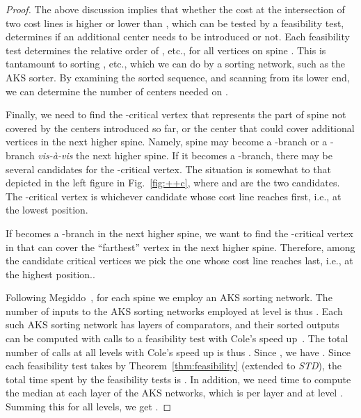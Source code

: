 \documentclass{llncs}
\newcommand{\QED}{\hfill}
\begin{document}
{\begin{proof}
The above discussion implies that whether the cost at the intersection of two cost lines
is higher or lower than ,
which can be tested by a feasibility test, 
determines if an additional center needs to be introduced or not.
Each feasibility test determines the relative order of , etc.,
for all vertices on spine .
This is tantamount to sorting , etc.,
which we can do by a sorting network, such as the AKS sorter.
By examining the sorted sequence, 
and scanning  from its lower end,
we can determine the number of centers needed on .
 

Finally, we need to find the -critical vertex that represents the part of spine 
not covered by the centers introduced so far,
or the center that could cover additional vertices in the next higher spine.
Namely,
spine  may become a -branch or a -branch {\em vis-\`{a}-vis}
the next higher spine.
If it becomes a -branch,
there may be several candidates for the -critical vertex.
The situation is somewhat to that depicted in the left figure in Fig.~\ref{fig:++c},
where  and  are the two candidates.
The -critical vertex is whichever candidate whose cost line reaches  first,
i.e., at the lowest position.

If  becomes a -branch in the next higher spine,
we want to find the -critical vertex in  that can cover the ``farthest'' vertex
in the next higher spine.
Therefore, among the candidate critical vertices we pick the one whose cost line reaches  last,
i.e., at the highest position..

Following Megiddo~\cite{megiddo1983c},
for each spine we employ an AKS sorting network.
The number of inputs to the AKS sorting networks employed at level  is thus .
Each such AKS sorting network has  layers of comparators,
and their sorted outputs can be computed with  calls to a feasibility test
with Cole's speed up~\cite{cole1987}.
The total number of calls at all levels  with Cole's speed up is thus
.
Since ,
we have .
Since each feasibility test takes  by Theorem~\ref{thm:feasibility}
(extended to {\it STD}),
the total time spent by the feasibility tests is .
In addition, we need time to compute the median at each layer of the AKS networks,
which is  per layer and  at level .
Summing this for all levels, we get
. 
\QED
\end{proof}


}
\end{document}
